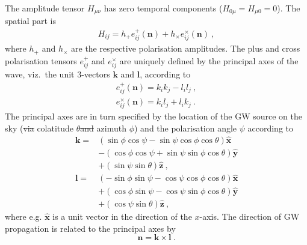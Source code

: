 \documentclass[fleqn,usenatbib,useAMS]{mnras}
\providecommand{\DIFadd}[1]{{\protect\color{blue}\uwave{#1}}} %
\providecommand{\DIFdel}[1]{{\protect\color{red}\sout{#1}}}                      %
\providecommand{\DIFaddbegin}{} %
\providecommand{\DIFaddend}{} %
\providecommand{\DIFdelbegin}{} %
\providecommand{\DIFdelend}{} %
\newcommand{\DIFscaledelfig}{0.5}
\newlength{\DIFdelgraphicswidth} %
\newlength{\DIFdelgraphicsheight} %
\newcommand{\DIFaddincludegraphics}[2][]{{\color{blue}\fbox{\DIFOincludegraphics[#1]{#2}}}} %
\newcommand{\DIFdelincludegraphics}[2][]{%
\sbox{\DIFdelgraphicsbox}{\DIFOincludegraphics[#1]{#2}}%
\settoboxwidth{\DIFdelgraphicswidth}{\DIFdelgraphicsbox} %
\settoboxtotalheight{\DIFdelgraphicsheight}{\DIFdelgraphicsbox} %
\scalebox{\DIFscaledelfig}{%
\parbox[b]{\DIFdelgraphicswidth}{\usebox{\DIFdelgraphicsbox}\\[-\baselineskip] \rule{\DIFdelgraphicswidth}{0em}}\llap{\resizebox{\DIFdelgraphicswidth}{\DIFdelgraphicsheight}{%
\setlength{\unitlength}{\DIFdelgraphicswidth}%
\begin{picture}(1,1)%
\thicklines\linethickness{2pt} %
{\color[rgb]{1,0,0}\put(0,0){\framebox(1,1){}}}%
{\color[rgb]{1,0,0}\put(0,0){\line( 1,1){1}}}%
{\color[rgb]{1,0,0}\put(0,1){\line(1,-1){1}}}%
\end{picture}%
}\hspace*{3pt}}} %
} %
\DeclareRobustCommand{\DIFaddbegin}{\DIFOaddbegin \let\includegraphics\DIFaddincludegraphics} %
\DeclareRobustCommand{\DIFaddend}{\DIFOaddend \let\includegraphics\DIFOincludegraphics} %
\DeclareRobustCommand{\DIFdelbegin}{\DIFOdelbegin \let\includegraphics\DIFdelincludegraphics} %
\DeclareRobustCommand{\DIFdelend}{\DIFOaddend \let\includegraphics\DIFOincludegraphics} %
\begin{document}
The amplitude tensor $H_{\mu \nu}$ has zero temporal components ($H_{0 \mu} = H_{\mu 0} = 0$). The spatial part is
\begin{align}
	H_{ij} = h_+ e_{ij}^+(\boldsymbol{n}) + h_{\times} e_{ij}^{\times}(\boldsymbol{n}) \ , \label{eq:hij}
\end{align}
where $h_{+}$ and $h_{\times}$ are the respective polarisation amplitudes. The plus and cross polarisation tensors $e_{ij}^{+}$ and $e_{ij}^{\times}$ are uniquely defined by the principal axes of the wave, viz.\ the unit 3-vectors $\boldsymbol{k}$ and $\boldsymbol{l}$, according to
\begin{align}
	e_{i j}^{+}(\boldsymbol{n}) =k_i k_j-l_i l_j \ , \\
		e_{i j}^{\times}(\boldsymbol{n}) =k_i l_j+l_i k_j \ .
\end{align}
The principal axes are in turn specified by the location of the GW source on the sky (\DIFdelbegin \DIFdel{via }\DIFdelend colatitude $\theta$\DIFdelbegin \DIFdel{and }\DIFdelend \DIFaddbegin \DIFadd{, }\DIFaddend azimuth $\phi$) and the polarisation angle $\psi$ according to
\begin{align}
	\boldsymbol{k}  = &(\sin \phi \cos \psi-\sin \psi \cos \phi \cos \theta) \boldsymbol{\hat{x}} \nonumber \\
	& -(\cos \phi \cos \psi+\sin \psi \sin \phi \cos \theta) \boldsymbol{\hat{y}} \nonumber \\
	& +(\sin \psi \sin \theta) \boldsymbol{\hat{z}} \ , \\
	\boldsymbol{l} = &(-\sin \phi \sin \psi-\cos \psi \cos \phi \cos \theta) \boldsymbol{\hat{x}} \nonumber \\
	& +(\cos \phi \sin \psi-\cos \psi \sin \phi \cos \theta) \boldsymbol{\hat{y}}\nonumber  \\
	& +(\cos \psi \sin \theta) \boldsymbol{\hat{z}} \ ,
\end{align}
where e.g. $\boldsymbol{\hat{x}}$ is a unit vector in the direction of the $x$-axis. The direction of GW propagation is related to the principal axes by
\begin{equation}
	\boldsymbol{n} = \boldsymbol{k} \times \boldsymbol{l} \ . 
\end{equation}
\end{document}
